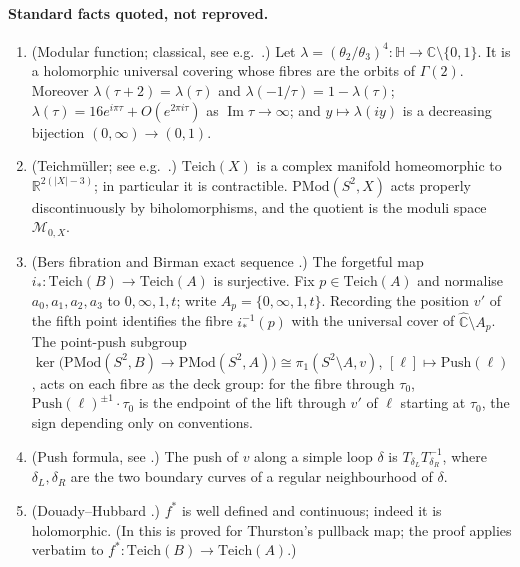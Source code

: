 \documentclass[11pt]{article}
\theoremstyle{definition}
\newcommand{\Teich}{\mathrm{Teich}}
\newcommand{\PMod}{\mathrm{PMod}}
\newcommand{\Ch}{\hat{\mathbb C}}
\newcommand{\HH}{\mathbb H}
\newcommand{\M}{\mathcal M}
\newcommand{\Push}{\mathrm{Push}}
\newcommand{\Img}{\operatorname{Im}}
\begin{document}
\paragraph{Standard facts quoted, not reproved.}
\begin{enumerate}[label=\textbf{(F\arabic*)},leftmargin=*]
\item \label{F1} (Modular function; classical, see e.g.\ \cite{Ahlfors,Chandra}.) Let $\lambda=(\theta_2/\theta_3)^4\colon\HH\to\mathbb C\setminus\{0,1\}$. It is a holomorphic universal covering whose fibres are the orbits of $\Gamma(2)$. Moreover $\lambda(\tau+2)=\lambda(\tau)$ and $\lambda(-1/\tau)=1-\lambda(\tau)$; $\lambda(\tau)=16e^{i\pi\tau}+O(e^{2\pi i\tau})$ as $\Img\tau\to\infty$; and $y\mapsto\lambda(iy)$ is a decreasing bijection $(0,\infty)\to(0,1)$.
\item \label{F2} (Teichm\"uller; see e.g.\ \cite{Hubbard}.) $\Teich(X)$ is a complex manifold homeomorphic to $\mathbb R^{2(|X|-3)}$; in particular it is contractible. $\PMod(S^2,X)$ acts properly discontinuously by biholomorphisms, and the quotient is the moduli space $\M_{0,X}$.
\item \label{F3} (Bers fibration and Birman exact sequence \cite{Bers,Birman,FM}.) The forgetful map $i_*\colon\Teich(B)\to\Teich(A)$ is surjective. Fix $p\in\Teich(A)$ and normalise $a_0,a_1,a_2,a_3$ to $0,\infty,1,t$; write $A_p=\{0,\infty,1,t\}$. Recording the position $v'$ of the fifth point identifies the fibre $i_*^{-1}(p)$ with the universal cover of $\Ch\setminus A_p$. The point-push subgroup $\ker\bigl(\PMod(S^2,B)\to\PMod(S^2,A)\bigr)\cong\pi_1(S^2\setminus A,v)$, $[\ell]\mapsto\Push(\ell)$, acts on each fibre as the deck group: for the fibre through $\tau_0$, $\Push(\ell)^{\pm1}\cdot\tau_0$ is the endpoint of the lift through $v'$ of $\ell$ starting at $\tau_0$, the sign depending only on conventions.
\item \label{F4} (Push formula, see \cite{FM}.) The push of $v$ along a simple loop $\delta$ is $T_{\delta_L}T_{\delta_R}^{-1}$, where $\delta_L,\delta_R$ are the two boundary curves of a regular neighbourhood of $\delta$.
\item \label{F5} (Douady--Hubbard \cite{DH}.) $f^*$ is well defined and continuous; indeed it is holomorphic. (In \cite{DH} this is proved for Thurston's pullback map; the proof applies verbatim to $f^*\colon\Teich(B)\to\Teich(A)$.)
\end{enumerate}
\end{document}
